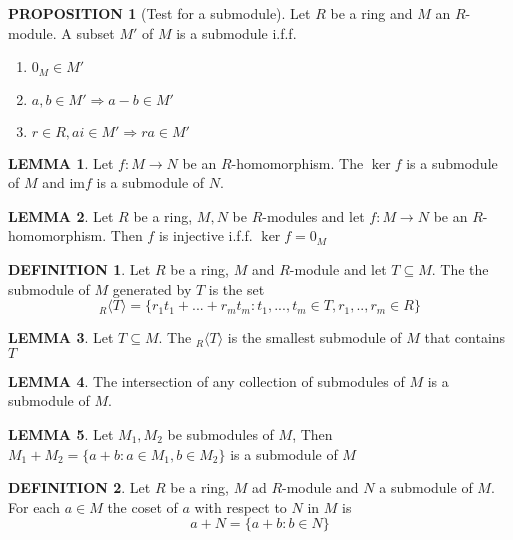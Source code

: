 \documentclass[10pt]{article}
\theoremstyle{definition}
\newtheorem{definition}{DEFINITION}[subsection]
\newcommand{\image}{\text{im}}
\newtheorem{lemma}{LEMMA}[subsection]
\newtheorem{prop}{PROPOSITION}[subsection]
\begin{document}
\begin{prop}[Test for a submodule]
    Let $R$ be a ring and $M$ an $R$-module. A subset $M'$ of $M$ is a submodule i.f.f.
    \begin{enumerate}
        \item $0_M \in M'$
        \item $a,b \in M' \Rightarrow a-b \in M'$
        \item $r \in R, a i\in M' \Rightarrow ra \in M'$
    \end{enumerate}
\end{prop}

\begin{lemma}
    Let $f: M \rightarrow N$ be an $R$-homomorphism. The $\ker f$ is a submodule of $M$ and $\image f$ is a submodule of $N$.
\end{lemma}

\begin{lemma}
    Let $R$ be a ring, $M,N$ be $R$-modules and let $f: M \rightarrow N$ be an $R$-homomorphism. Then $f$ is injective i.f.f. $\ker f = {0_M}$
\end{lemma}

\begin{definition}
    Let $R$ be a ring, $M$ and $R$-module and let $T \subseteq M$. The the submodule of $M$ generated by $T$ is the set
    $$_R\langle T \rangle = \{r_1t_1 + ... + r_mt_m:t_1,...,t_m \in T, r_1,..,r_m \in R\}$$
\end{definition}

\begin{lemma}
    Let $T\subseteq M$. The $_R\langle T\rangle$ is the smallest submodule of $M$ that contains $T$
\end{lemma}

\begin{lemma}
    The intersection of any collection of submodules of $M$ is a submodule of $M$.
\end{lemma}

\begin{lemma}
    Let $M_1, M_2$ be submodules of $M$, Then $M_1 + M_2 = \{a+b:a\in M_1, b\in M_2\}$ is a submodule of $M$
\end{lemma}

\begin{definition}
    Let $R$ be a ring, $M$ ad $R$-module and $N$ a submodule of $M$. For each $a \in M$ the coset of $a$ with respect to $N$ in $M$ is
    $$a+N = \{a+b:b\in N\}$$
\end{definition}
\end{document}
